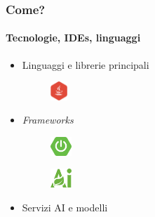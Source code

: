 \begin{frame}[t] \frametitle{Come?}
\framesubtitle{Tecnologie, IDEs, linguaggi}
\begin{itemize}[leftmargin=10pt,align=right]
    \setlength\itemsep{.7em}
    \item[\alert{\faHandORight}] Linguaggi e librerie principali
    \begin{minipage}[t]{\textwidth}
        \begin{minipage}[t]{.2\textwidth}
            \begin{figure}[ht]
                \includegraphics[height=20pt,keepaspectratio]{img/java.png}
            \end{figure}
        \end{minipage}
    \end{minipage}
    \item[\alert{\faHandORight}] \emph{Frameworks}
    \begin{minipage}[t]{\textwidth}
        \begin{minipage}[t]{.2\textwidth}
            \begin{figure}[ht]
                \includegraphics[height=20pt,keepaspectratio]{img/spring-boot.png}
            \end{figure}
        \end{minipage}
        \begin{minipage}[t]{.2\textwidth}
            \begin{figure}[ht]
                \includegraphics[height=20pt,keepaspectratio]{img/spring-ai-cut.png}
            \end{figure}
        \end{minipage}
    \end{minipage}
    \item[\alert{\faHandORight}] Servizi AI e modelli
    \begin{minipage}[t]{\textwidth}
        \begin{minipage}[t]{.2\textwidth}
            \begin{figure}[ht]

\end{figure}
\end{minipage}
\end{minipage}
\end{itemize}
\end{frame}
